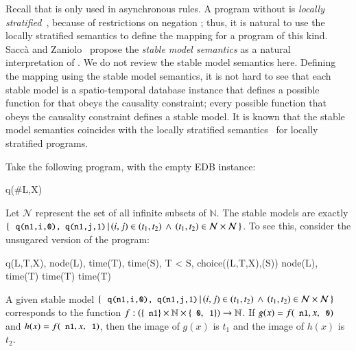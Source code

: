 Recall that  is only used in asynchronous rules.  A \lang program without  is {\em locally stratified}~\cite{local-strat}, because of restrictions on negation ; thus, it is natural to use the locally stratified semantics to define the mapping for a \lang program of this kind.  Sacc\`{a} and Zaniolo~\cite{sacca-zaniolo} propose the {\em stable model semantics} as a natural interpretation of .  We do not review the stable model semantics here.    Defining the mapping using the stable model semantics, it is not hard to see that each stable model is a spatio-temporal database instance that defines a possible function for  that obeys the causality constraint; every possible function that obeys the causality constraint defines a stable model.    It is known that the stable model semantics coincides with the locally stratified semantics~\cite{stable-model} for locally stratified programs.

\begin{example}
\label{ex:uncountable}
Take the following \lang program, with the empty EDB instance:

\begin{Drules}
        {q(#L,X)}
\end{Drules}

Let $\mathcal{N}$ represent the set of all infinite subsets of $\mathbb{N}$.
The stable models  are exactly $\{ \, \dedalus{q(n1,i,0), q(n1,j,1)} \, | \, (i,j) \in (t_1, t_2) \, \land \, (t_1, t_2) \in \mathcal{N}
\times \mathcal{N} \, \}$.  To see this, consider the unsugared version of the program:

\begin{Drules}
        {q(L,T,X), node(L), time(T), time(S), T < S, choice((L,T,X),(S))}
        {node(L), time(T)}
        {time(T)}
        {time(T)}
\end{Drules}

A given stable model $\{ \, \dedalus{q(n1,i,0), q(n1,j,1)} \, | \, (i,j)\in (t_1, t_2) \, \land \, (t_1, t_2)\in \mathcal{N}                                                    
\times \mathcal{N} \, \}$ corresponds to the function $f : \left(\{\dedalus{n1}\} \times \mathbb{N} \times \{\dedalus{0},\dedalus{1}\}\right) \rightarrow \mathbb{N}$.  If $g(x) = f(\dedalus{n1}, x, \dedalus{0})$ and $h(x) = f(\dedalus{n1}, x, \dedalus{1})$, then the image of $g(x)$ is $t_1$ and the image of $h(x)$ is $t_2$.
\end{example}

